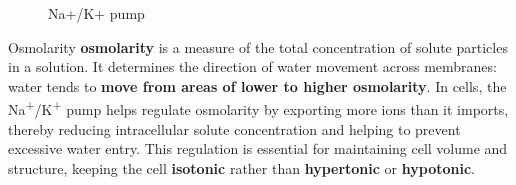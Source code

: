 \documentclass[../main.tex]{subfiles}
\begin{document}
\begin{figure}[H]
	\centering
	\caption{Na+/K+ pump}
\end{figure} 

\begin{RemarkWithTitel}{Osmolarity}
	\textbf{\gls{osmolarity}} is a measure of the total concentration of solute particles in a solution. It determines the direction of water movement across membranes: water tends to \textbf{move from areas of lower to higher osmolarity}. In cells, the Na\textsuperscript{+}/K\textsuperscript{+} pump helps regulate osmolarity by exporting more ions than it imports, thereby reducing intracellular solute concentration and helping to prevent excessive water entry. This regulation is essential for maintaining cell volume and structure, keeping the cell \textbf{\gls{isotonic}} rather than \textbf{\gls{hypertonic}} or \textbf{\gls{hypotonic}}.
\end{RemarkWithTitel}
\end{document}
